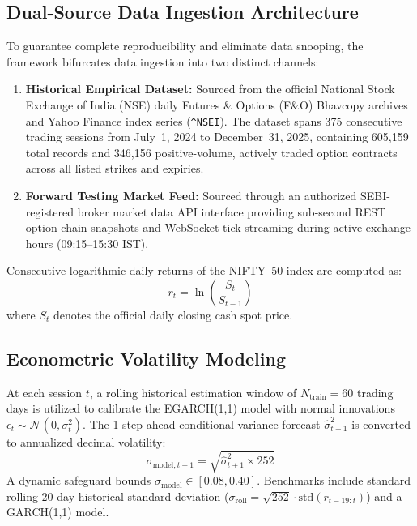 \documentclass[journal]{IEEEtran}
\begin{document}
\subsection{Dual-Source Data Ingestion Architecture}
To guarantee complete reproducibility and eliminate data snooping, the framework bifurcates data ingestion into two distinct channels:
\begin{enumerate}
    \item \textbf{Historical Empirical Dataset:} Sourced from the official National Stock Exchange of India (NSE) daily Futures \& Options (F\&O) Bhavcopy archives and Yahoo Finance index series (\texttt{\string^NSEI}). The dataset spans 375 consecutive trading sessions from July~1, 2024 to December~31, 2025, containing 605{,}159 total records and 346{,}156 positive-volume, actively traded option contracts across all listed strikes and expiries.
    \item \textbf{Forward Testing Market Feed:} Sourced through an authorized SEBI-registered broker market data API interface providing sub-second REST option-chain snapshots and WebSocket tick streaming during active exchange hours (09:15--15:30 IST).
\end{enumerate}

Consecutive logarithmic daily returns of the NIFTY~50 index are computed as:
\begin{equation}
r_t = \ln\left(\frac{S_t}{S_{t-1}}\right)
\end{equation}
where $S_t$ denotes the official daily closing cash spot price.

\subsection{Econometric Volatility Modeling}
At each session $t$, a rolling historical estimation window of $N_{\mathrm{train}}=60$ trading days is utilized to calibrate the EGARCH(1,1) model with normal innovations $\epsilon_t \sim \mathcal{N}(0, \sigma_t^2)$. The 1-step ahead conditional variance forecast $\hat{\sigma}_{t+1}^2$ is converted to annualized decimal volatility:
\begin{equation}
\sigma_{\mathrm{model},t+1} = \sqrt{\hat{\sigma}_{t+1}^2 \times 252}
\end{equation}
A dynamic safeguard bounds $\sigma_{\mathrm{model}} \in [0.08, 0.40]$. Benchmarks include standard rolling 20-day historical standard deviation ($\sigma_{\mathrm{roll}} = \sqrt{252} \cdot \mathrm{std}(r_{t-19:t})$) and a GARCH(1,1) model.
\end{document}
